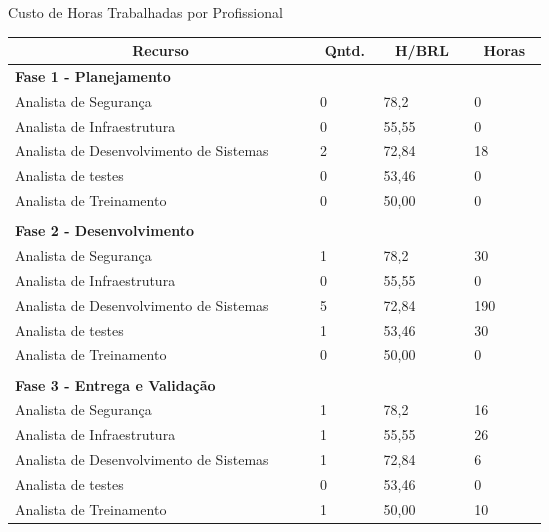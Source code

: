 \begin{enumerate}
    \begin{quadro}[H]
    \caption{Custo de Horas Trabalhadas por Profissional}
    \label{custo-projeto-horas-trabalhadas}
    	\centering\footnotesize
        \begin{tabular}{|p{0.40\linewidth} | p{0.04\linewidth} | p{0.10\linewidth} |  p{0.08\linewidth} | }  \hline
        \multicolumn{1}{|c|}{\textbf{Recurso}} &
        \multicolumn{1}{|c|}{\textbf{Qntd.}} &
        \multicolumn{1}{c|}{\textbf{H/BRL}} &
        \multicolumn{1}{c|}{\textbf{Horas}} \\ \hline
          
        {\textbf{Fase 1 - Planejamento}}    &   &    &          \\  \hline
        Analista de Segurança & 0 & 78,2 & 0            \\ \hline
        Analista de Infraestrutura & 0 & 55,55 & 0         \\ \hline
        Analista de Desenvolvimento de Sistemas & 2 & 72,84 & 18              \\ \hline
        Analista de testes &  0 &  53,46 & 0                              \\\hline
        Analista de Treinamento &  0 &  50,00 & 0                          \\\hline
            & &  & \\ \hline
       {\textbf{Fase 2 - Desenvolvimento}}    &   &    &          \\  \hline
        Analista de Segurança & 1 & 78,2 & 30            \\ \hline
        Analista de Infraestrutura & 0 & 55,55 & 0         \\ \hline
        Analista de Desenvolvimento de Sistemas & 5 & 72,84 & 190              \\ \hline
        Analista de testes &  1 &  53,46 & 30                              \\\hline
        Analista de Treinamento &  0 &  50,00 & 0                          \\\hline
            & &  & \\ \hline
       {\textbf{Fase 3 - Entrega e Validação}}    &   &    &         \\  \hline
        Analista de Segurança & 1 & 78,2 & 16            \\ \hline
        Analista de Infraestrutura & 1 & 55,55 & 26         \\ \hline
        Analista de Desenvolvimento de Sistemas & 1 & 72,84 & 6             \\ \hline
        Analista de testes &  0 &  53,46 & 0                              \\\hline
        Analista de Treinamento &  1 &  50,00 & 10                          \\\hline   
        \end{tabular}
    \end{quadro}
\end{enumerate}

